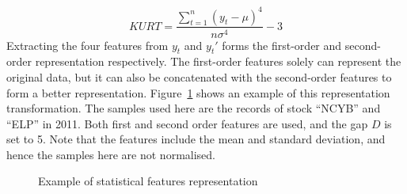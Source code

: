 \begin{equation} 
    KURT = \frac{\sum_{t=1}^n (y_t-\mu)^4}{n\sigma^4} - 3
\end{equation}
Extracting the four features from $y_t$ and $y_t\prime$ forms the first-order and second-order representation respectively. The first-order features solely can represent the original data, but it can also be concatenated with the second-order features to form a better representation. Figure~\ref{fig:nycbelp1} shows an example of this representation transformation. The samples used here are the records of stock ``NCYB'' and ``ELP'' in 2011. Both first and second order features are used, and the gap $D$ is set to 5. Note that the features include the mean and standard deviation, and hence the samples here are not normalised.
\begin{figure}[!htbp]
    \centering 
    \caption{Example of statistical features representation} 
    \label{fig:nycbelp1} 
\end{figure} 

